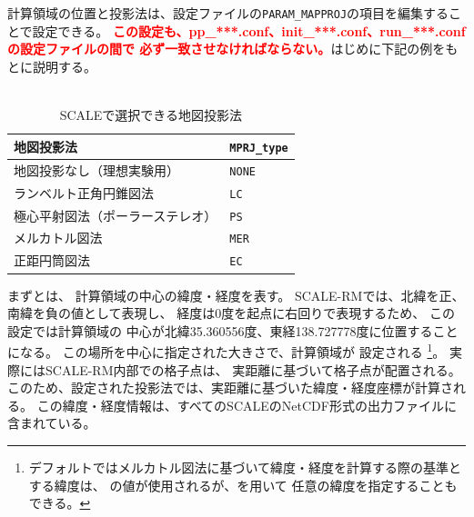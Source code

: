\section{\SecAdvanceMapprojectionSetting} \label{sec:adv_mapproj}
計算領域の位置と投影法は、設定ファイルの\verb|PARAM_MAPPROJ|の項目を編集することで設定できる。
\textcolor{red}{\bf この設定も、pp\_***.conf、init\_***.conf、run\_***.confの設定ファイルの間で
必ず一致させなければならない。}はじめに下記の例をもとに説明する。\\

\\

\begin{table}[b]
\begin{center}
\caption{SCALEで選択できる地図投影法}
\begin{tabularx}{150mm}{|l|X|} \hline
 \rowcolor[gray]{0.9} 地図投影法 & \verb|MPRJ_type| \\ \hline
 地図投影なし（理想実験用）& \verb|NONE| \\ \hline
 ランベルト正角円錐図法 & \verb|LC| \\ \hline
 極心平射図法（ポーラーステレオ） & \verb|PS| \\ \hline
 メルカトル図法 & \verb|MER| \\ \hline
 正距円筒図法 & \verb|EC| \\ \hline
\end{tabularx}
\label{tab:map_proj}
\end{center}
\end{table}


\noindent
まずとは、
計算領域の中心の緯度・経度を表す。
SCALE-RMでは、北緯を正、南緯を負の値として表現し、
経度は0度を起点に右回りで表現するため、
この設定では計算領域の
中心が北緯35.360556度、東経138.727778度に位置することになる。
この場所を中心に指定された大きさで、計算領域が
設定される
\footnote{デフォルトではメルカトル図法に基づいて緯度・経度を計算する際の基準とする緯度は、
の値が使用されるが、を用いて
任意の緯度を指定することもできる。}。
実際にはSCALE-RM内部での格子点は、
実距離に基づいて格子点が配置される。
このため、設定された投影法では、実距離に基づいた緯度・経度座標が計算される。
この緯度・経度情報は、すべてのSCALEのNetCDF形式の出力ファイルに含まれている。



